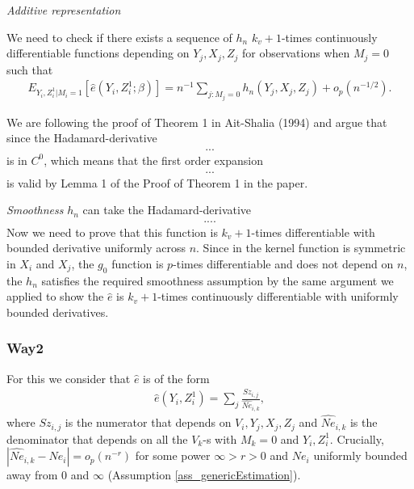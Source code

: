 \documentclass{article}
\theoremstyle{definition}
\theoremstyle{remark}
\begin{document}
\emph{Additive representation}

We need to check if there exists a sequence of $h_n$ $k_v+1$-times continuously differentiable functions depending on $Y_j,X_j,Z_j$ for observations when $M_j=0$ such that
\begin{align}\label{eq_corKernelAdditive}
E_{Y_i,Z_i^1|M_i=1}[\hat{e}(Y_i, Z_i^1; \beta)]= n^{-1}\sum_{j: M_j=0} h_n(Y_j,X_j,Z_j) + o_p(n^{-1/2}). \nonumber
\end{align}

We are following the proof of Theorem 1 in Ait-Shalia (1994) and argue that since the Hadamard-derivative
\begin{align}
...
\end{align}
is in $C^0$, which means that the first order expansion
\begin{align}
...
\end{align}
is valid by Lemma 1 of the Proof of Theorem 1 in the paper.

\emph{Smoothness}
$h_n$ can take the Hadamard-derivative
\begin{align}
....
\end{align}
Now we need to prove that this function is $k_v+1$-times differentiable with bounded derivative uniformly across $n$. Since in the kernel function is symmetric in $X_i$ and $X_j$, the $g_0$ function is $p$-times differentiable and does not depend on $n$, the $h_n$ satisfies the required smoothness assumption by the same argument we applied to show the $\hat{e}$ is $k_v+1$-times continuously differentiable with uniformly bounded derivatives.

\subsubsection{Way2}
For this we consider that $\hat{e}$ is of the form
\begin{align}
\hat{e}(Y_i, Z_i^1) = \sum_j\frac{Sz_{i,j}}{\hat{Ne}_{i,k}}, 
\end{align}
where $Sz_{i,j}$ is the numerator that depends on $V_i, Y_j, X_j, Z_j$ and $\hat{Ne}_{i,k}$ is the denominator that depends on all the $V_k$-s with $M_k=0$ and $Y_i, Z_i^1$. Crucially, $|\hat{Ne}_{i,k}- Ne_i| = o_p(n^{-r})$ for some power $\infty>r>0$ and $Ne_i$ uniformly bounded away from $0$ and $\infty$ (Assumption \ref{ass_genericEstimation}).
\end{document}
